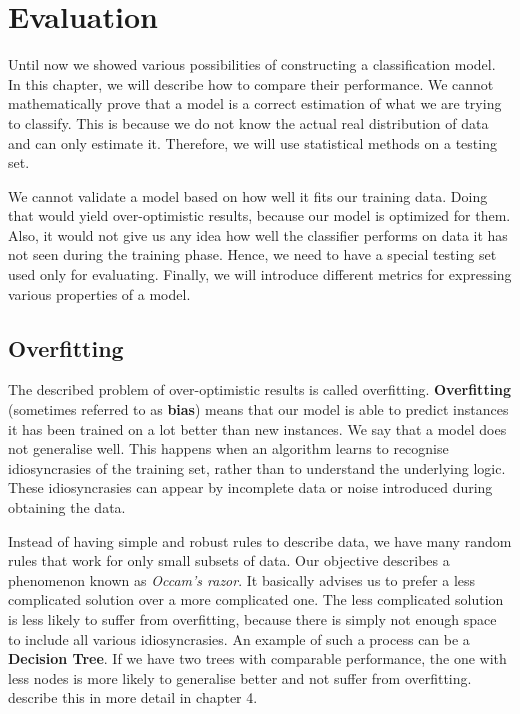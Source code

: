 \chapter{Evaluation} \label{chap:eval}

Until now we showed various possibilities of constructing a classification model.
In this chapter, we will describe how to compare their performance.
We cannot mathematically prove that a model is a correct estimation of what we are trying to classify.
This is because we do not know the actual real distribution of data and can only estimate it.
Therefore, we will use statistical methods on a testing set.

We cannot validate a model based on how well it fits our training data.
Doing that would yield over-optimistic results, because our model is optimized for them.
Also, it would not give us any idea how well the classifier performs on data it has not seen during the training phase.
Hence, we need to have a special testing set used only for evaluating.
Finally, we will introduce different metrics for expressing various properties of a model.

\section{Overfitting}

The described problem of over-optimistic results is called overfitting.
{\bf Overfitting} (sometimes referred to as {\bf bias}) means
that our model is able to predict instances it has been trained on a lot better than new instances. 
We say that a model does not generalise well.
This happens when an algorithm learns to recognise idiosyncrasies of the training set,
rather than to understand the underlying logic.
These idiosyncrasies can appear by incomplete data or noise introduced during obtaining the data.

Instead of having simple and robust rules to describe data,
we have many random rules that work for only small subsets of data.
Our objective describes a phenomenon known as {\it Occam's razor}. 
It basically advises us to prefer a less complicated solution over a more complicated one.
The less complicated solution is less likely to suffer from overfitting,
because there is simply not enough space to include all various idiosyncrasies.
An example of such a process can be a {\bf Decision Tree}.
If we have two trees with comparable performance,
the one with less nodes is more likely to generalise better and not suffer from overfitting.
\citet{TanBachKum08} describe this in more detail in chapter 4.

